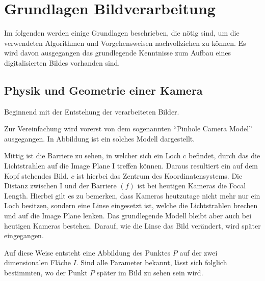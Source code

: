 \section{Grundlagen Bildverarbeitung}
\label{sec:basics}
Im folgenden werden einige Grundlagen beschrieben, die nötig sind, um die verwendeten Algorithmen und Vorgehensweisen nachvollziehen zu können. Es wird davon ausgegangen das grundlegende Kenntnisse zum Aufbau eines digitalisierten Bildes vorhanden sind. 
\subsection{Physik und Geometrie einer Kamera}
\label{sec:camerageo}
Beginnend mit der Entstehung der verarbeiteten Bilder. 

Zur Vereinfachung wird vorerst von dem sogenannten "`Pinhole Camera Model"' ausgegangen. In Abbildung  ist ein solches Modell dargestellt. 

Mittig ist die Barriere zu sehen, in welcher sich ein Loch c befindet, durch das die Lichtstrahlen auf die Image Plane I treffen können. Daraus resultiert ein auf dem Kopf stehendes Bild. $c$ ist hierbei das Zentrum des Koordinatensystems.
Die Distanz zwischen I und der Barriere $(f)$ ist bei heutigen Kameras die Focal Length. Hierbei gilt es zu bemerken, dass Kameras heutzutage nicht mehr nur ein Loch besitzen, sondern eine Linse eingesetzt ist, welche die Lichtstrahlen brechen und auf die Image Plane lenken. Das grundlegende Modell bleibt aber auch bei heutigen Kameras bestehen. Darauf, wie die Linse das Bild verändert, wird später eingegangen. 

Auf diese Weise entsteht eine Abbildung des Punktes $P$ auf der zwei dimensionalen Fläche $I$. Sind alle Parameter bekannt, lässt sich folglich bestimmten, wo der Punkt $P$ später im Bild zu sehen sein wird. 

